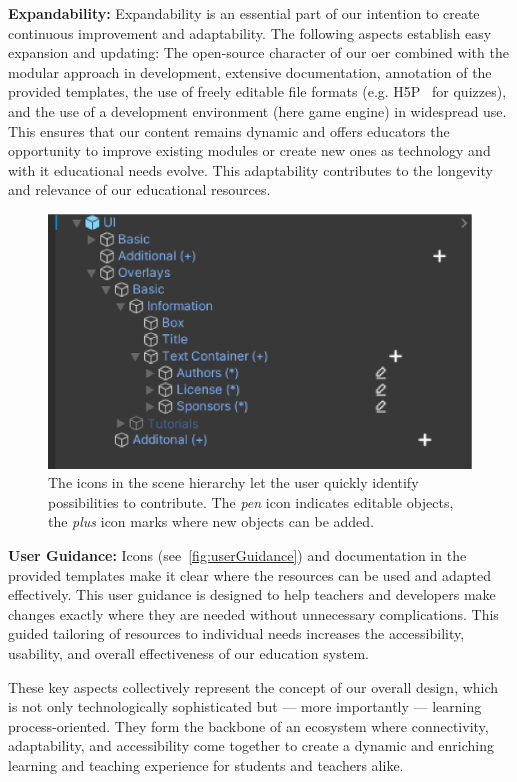 \textbf{Expandability:}
Expandability is an essential part of our intention to create continuous improvement and adaptability. The following aspects establish easy expansion and updating: The open-source character of our \acrshort{oer} combined with the modular approach in development, extensive documentation, annotation of the provided templates, the use of freely editable file formats (e.g. H5P~\cite{Singleton_Charlton_2019} for quizzes), and the use of a development environment (here game engine) in widespread use. This ensures that our content remains dynamic and offers educators the opportunity to improve existing modules or create new ones as technology and with it educational needs evolve. This adaptability contributes to the longevity and relevance of our educational resources.

\begin{figure}[h!tb]
	\centering
	\includegraphics[width=0.6\linewidth]{pictures/userGuidance_Icons.png}
	\captionsetup{labelfont=bf,textfont=it}
	\caption{The icons in the scene hierarchy let the user quickly identify possibilities to contribute. The \emph{pen} icon indicates editable objects, the \emph{plus} icon marks where new objects can be added.\label{fig:userGuidance}}
\end{figure}

\textbf{User Guidance:}
Icons (see~\autoref{fig:userGuidance}) and documentation in the provided templates make it clear where the resources can be used and adapted effectively. This user guidance is designed to help teachers and developers make changes exactly where they are needed without unnecessary complications. This guided tailoring of resources to individual needs increases the accessibility, usability, and overall effectiveness of our education system.

These key aspects collectively represent the concept of our overall design, which is not only technologically sophisticated but --- more importantly --- learning process-oriented. They form the backbone of an ecosystem where connectivity, adaptability, and accessibility come together to create a dynamic and enriching learning and teaching experience for students and teachers alike.


